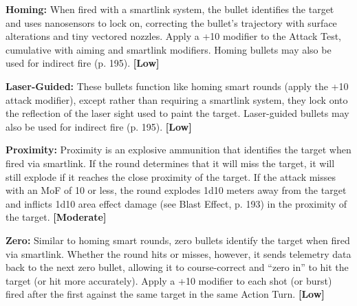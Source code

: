 \textbf{Homing:} When fired with a smartlink system, the bullet identifies the target and uses nanosensors to lock on, correcting the bullet’s trajectory with surface alterations and tiny vectored nozzles. Apply a +10 modifier to the Attack Test, cumulative with aiming and smartlink modifiers. Homing bullets may also be used for indirect fire (p. 195). \textbf{[Low]} 

\textbf{Laser-Guided:} These bullets function like homing smart rounds (apply the +10 attack modifier), except rather than requiring a smartlink system, they lock onto the reflection of the laser sight used to paint the target. Laser-guided bullets may also be used for indirect fire (p. 195). \textbf{[Low]} 

\textbf{Proximity:} Proximity is an explosive ammunition that identifies the target when fired via smartlink. If the round determines that it will miss the target, it will still explode if it reaches the close proximity of the target. If the attack misses with an MoF of 10 or less, the round explodes 1d10 meters away from the target and inflicts 1d10 area effect damage (see Blast Effect, p. 193) in the proximity of the target. \textbf{[Moderate]} 

\textbf{Zero:} Similar to homing smart rounds, zero bullets identify the target when fired via smartlink. Whether the round hits or misses, however, it sends telemetry data back to the next zero bullet, allowing it to course-correct and ``zero in'' to hit the target (or hit more accurately). Apply a +10 modifier to each shot (or burst) fired after the first against the same target in the same Action Turn. \textbf{[Low]} 

